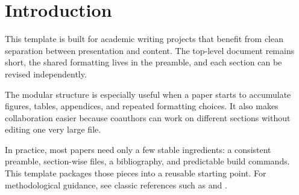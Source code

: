 \section{Introduction}

This template is built for academic writing projects that benefit from clean separation between presentation and content. The top-level document remains short, the shared formatting lives in the preamble, and each section can be revised independently.

The modular structure is especially useful when a paper starts to accumulate figures, tables, appendices, and repeated formatting choices. It also makes collaboration easier because coauthors can work on different sections without editing one very large file.

In practice, most papers need only a few stable ingredients: a consistent preamble, section-wise files, a bibliography, and predictable build commands. This template packages those pieces into a reusable starting point. For methodological guidance, see classic references such as \citet{angrist2001} and \citet{wooldridge2010}.
